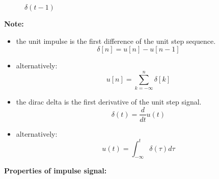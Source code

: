 \documentclass[a4paper,12pt]{book}
\begin{document}
\begin{figure}[h]  
\centering 
{}\hspace{6mm}
\caption{$\delta(t-1)$} \label{fig:M}  
\end{figure}
{\bf Note:}\\
\begin{itemize}
\item the unit impulse is the first difference of the unit step sequence.
$$\delta[n]=u[n]-u[n-1]$$
\item alternatively:
$$u[n]=\sum_{k=-\infty}^{n}\delta[k]$$
\item the dirac delta is the first derivative of the unit step signal.
$$\delta(t)=\frac{d}{dt}u(t)$$
\item alternatively:
$$u(t)=\int_{-\infty}^{t}\delta(\tau) d\tau$$
\end{itemize}
{\bf Properties of impulse signal:}\\
\end{document}
